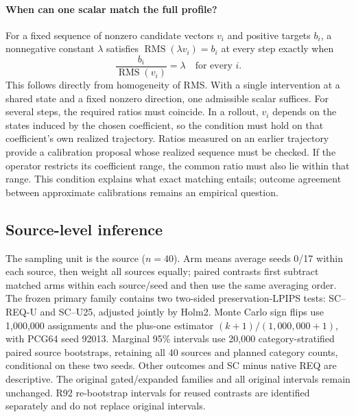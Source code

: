 \documentclass[10pt,doubleanonymous]{ieeeconf}
\newcommand{\RMS}{\operatorname{RMS}}
\begin{document}
\paragraph{When can one scalar match the full profile?}
For a fixed sequence of nonzero candidate vectors $v_i$ and positive targets $b_i$, a nonnegative constant $\lambda$ satisfies $\RMS(\lambda v_i)=b_i$ at every step exactly when
\begin{equation}
\frac{b_i}{\RMS(v_i)}=\lambda\quad\text{for every }i.
\end{equation}
This follows directly from homogeneity of RMS. With a single intervention at a shared state and a fixed nonzero direction, one admissible scalar suffices. For several steps, the required ratios must coincide. In a rollout, $v_i$ depends on the states induced by the chosen coefficient, so the condition must hold on that coefficient's own realized trajectory. Ratios measured on an earlier trajectory provide a calibration proposal whose realized sequence must be checked. If the operator restricts its coefficient range, the common ratio must also lie within that range. This condition explains what exact matching entails; outcome agreement between approximate calibrations remains an empirical question.

\subsection{Source-level inference}
The sampling unit is the source ($n=40$). Arm means average seeds 0/17 within each source, then weight all sources equally; paired contrasts first subtract matched arms within each source/seed and then use the same averaging order. The frozen primary family contains two two-sided preservation-LPIPS tests: SC--REQ-U and SC--U25, adjusted jointly by Holm2. Monte Carlo sign flips use 1,000,000 assignments and the plus-one estimator $(k+1)/(1{,}000{,}000+1)$, with PCG64 seed 92013. Marginal 95\% intervals use 20,000 category-stratified paired source bootstraps, retaining all 40 sources and planned category counts, conditional on these two seeds. Other outcomes and SC minus native REQ are descriptive. The original gated/expanded families and all original intervals remain unchanged. R92 re-bootstrap intervals for reused contrasts are identified separately and do not replace original intervals.
\end{document}
